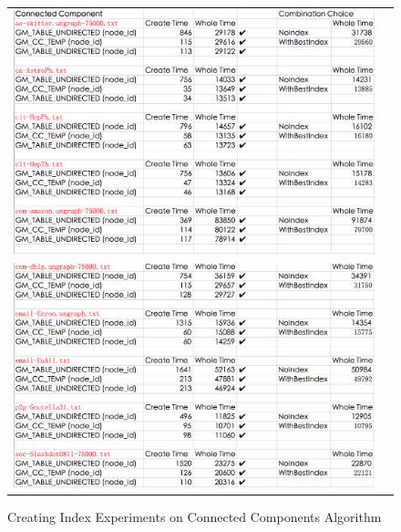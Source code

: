 \begin{figure}[H]
\begin{center}
\begin{tabular}{cc}
     \includegraphics[width=1.0\textwidth]{FIG/CC1.png} \\
     \includegraphics[width=1.0\textwidth]{FIG/CC2.png} \\
\end{tabular}
\caption{Creating Index Experiments on Connected Components Algorithm}
\end{center}
\end{figure}

